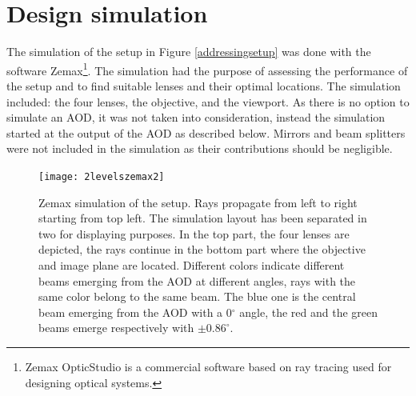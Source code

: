 \section{Design simulation}
The simulation of the setup in Figure \ref{addressingsetup} was done with the software Zemax\footnote{Zemax OpticStudio is a commercial software based on ray tracing used for designing optical systems.}. The simulation had the purpose of assessing the performance of the setup and to find suitable lenses and their optimal locations. The simulation included: the four lenses, the objective, and the viewport. As there is no option to simulate an AOD, it was not taken into consideration, instead the simulation started at the output of the AOD as described below. Mirrors and beam splitters were not included in the simulation as their contributions should be negligible.
\begin{figure}
\centering
\texttt{[image: 2levelszemax2]}
\caption{Zemax simulation of the setup. Rays propagate from left to right starting from top left. The simulation layout has been separated in two for displaying purposes. In the top part, the four lenses are depicted, the rays continue in the bottom part where the objective and image plane are located. Different colors indicate different beams emerging from the AOD at different angles, rays with the same color belong to the same beam. The blue one is the central beam emerging from the AOD with a 0$^\circ$ angle, the red and the green beams emerge respectively with $\pm0.86^\circ$.}
\label{zemaxview}
\end{figure}
